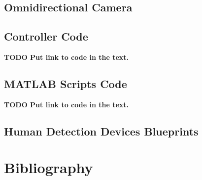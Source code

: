 \documentclass[oneside, a4paper, 12pt]{memoir}
\begin{document}
\chapter{Omnidirectional Camera}

\chapter{Controller Code}

\textbf{TODO Put link to code in the text.}

\chapter{MATLAB Scripts Code}

\textbf{TODO Put link to code in the text.}

\chapter{Human Detection Devices Blueprints}

\backmatter
\newpage

\part*{Bibliography}
\end{document}
